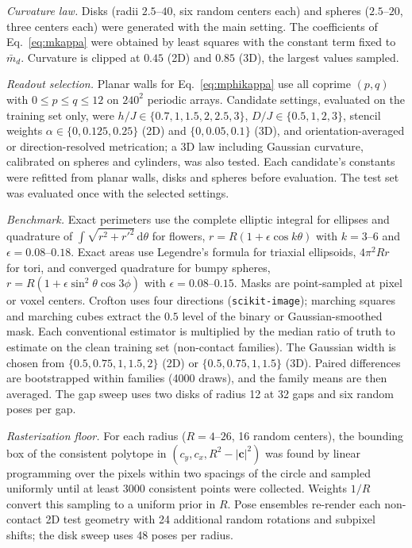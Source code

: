 \documentclass[11pt,a4paper]{article}
\newcommand{\dd}{\mathrm{d}}
\begin{document}
\emph{Curvature law.} Disks (radii $2.5$--$40$, six random centers each) and spheres ($2.5$--$20$, three centers each) were generated with the main setting. The coefficients of Eq.~\eqref{eq:mkappa} were obtained by least squares with the constant term fixed to $\bar m_d$. Curvature is clipped at $0.45$ (2D) and $0.85$ (3D), the largest values sampled.

\emph{Readout selection.} Planar walls for Eq.~\eqref{eq:mphikappa} use all coprime $(p,q)$ with $0\le p\le q\le12$ on $240^2$ periodic arrays. Candidate settings, evaluated on the training set only, were $h/J\in\{0.7,1,1.5,2,2.5,3\}$, $D/J\in\{0.5,1,2,3\}$, stencil weights $\alpha\in\{0,0.125,0.25\}$ (2D) and $\{0,0.05,0.1\}$ (3D), and orientation-averaged or direction-resolved metrication; a 3D law including Gaussian curvature, calibrated on spheres and cylinders, was also tested. Each candidate's constants were refitted from planar walls, disks and spheres before evaluation. The test set was evaluated once with the selected settings.

\emph{Benchmark.} Exact perimeters use the complete elliptic integral for ellipses and quadrature of $\int\sqrt{r^2+r'^2}\,\dd\theta$ for flowers, $r=R(1+\epsilon\cos k\theta)$ with $k=3$--$6$ and $\epsilon=0.08$--$0.18$. Exact areas use Legendre's formula for triaxial ellipsoids, $4\pi^2Rr$ for tori, and converged quadrature for bumpy spheres, $r=R(1+\epsilon\sin^2\theta\cos3\phi)$ with $\epsilon=0.08$--$0.15$. Masks are point-sampled at pixel or voxel centers. Crofton uses four directions (\texttt{scikit-image}); marching squares and marching cubes extract the $0.5$ level of the binary or Gaussian-smoothed mask. Each conventional estimator is multiplied by the median ratio of truth to estimate on the clean training set (non-contact families). The Gaussian width is chosen from $\{0.5,0.75,1,1.5,2\}$ (2D) or $\{0.5,0.75,1,1.5\}$ (3D). Paired differences are bootstrapped within families (4000 draws), and the family means are then averaged. The gap sweep uses two disks of radius 12 at 32 gaps and six random poses per gap.

\emph{Rasterization floor.} For each radius ($R=4$--$26$, 16 random centers), the bounding box of the consistent polytope in $(c_y,c_x,R^2-|\bm c|^2)$ was found by linear programming over the pixels within two spacings of the circle and sampled uniformly until at least $3000$ consistent points were collected. Weights $1/R$ convert this sampling to a uniform prior in $R$. Pose ensembles re-render each non-contact 2D test geometry with 24 additional random rotations and subpixel shifts; the disk sweep uses 48 poses per radius.
\end{document}
